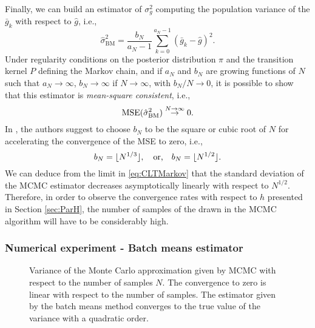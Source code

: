 Finally, we can build an estimator of $\sigma_g^2$ computing the population variance of the $\bar g_k$ with respect to $\hat g$, i.e.,
\begin{equation}
	\hat\sigma^2_{\mathrm{BM}} = \frac{b_N}{a_N - 1} \sum_{k=0}^{a_N -1}(\bar g_k - \hat g)^2. 
\end{equation}
Under regularity conditions on the posterior distribution $\pi$ and the transition kernel $P$ defining the Markov chain, and if $a_N$ and $b_N$ are growing functions of $N$ such that $a_N \to \infty$, $b_N \to \infty$ if $N \to \infty$, with $b_N / N \to 0$, it is possible to show \cite{FlJ10} that this estimator is \textit{mean-square consistent}, i.e.,
\begin{equation}
	\operatorname{MSE}(\hat\sigma^2_{\mathrm{BM}}) \stackrel{N\to\infty}{\to} 0.
\end{equation}
In \cite{FlJ10}, the authors suggest to choose $b_N$ to be the square or cubic root of $N$ for accelerating the convergence of the MSE to zero, i.e.,
\begin{equation}
	b_N = \lfloor N^{1/3}\rfloor, \quad \text{or,} \quad b_N = \lfloor N^{1/2}\rfloor.
\end{equation}
We can deduce from the limit in \eqref{eq:CLTMarkov} that the standard deviation of the MCMC estimator decreases asymptotically linearly with respect to $N^{1/2}$. Therefore, in order to observe the convergence rates with respect to $h$ presented in Section \ref{sec:ParH}, the number of samples of the drawn in the MCMC algorithm will have to be considerably high.

\subsubsection{Numerical experiment - Batch means estimator}

\begin{figure}[t]
	\centering
	\begin{subfigure}{0.49\linewidth}
		\centering
		\resizebox{1.0\linewidth}{!}{}
	\end{subfigure}
	\begin{subfigure}{0.49\linewidth}
		\centering
		\resizebox{1.0\linewidth}{!}{}
	\end{subfigure}
	\caption{Variance of the Monte Carlo approximation given by MCMC with respect to the number of samples $N$. The convergence to zero is linear with respect to the number of samples. The estimator given by the batch means method converges to the true value of the variance with a quadratic order.}
	\label{fig:BatchMeans}
\end{figure}

